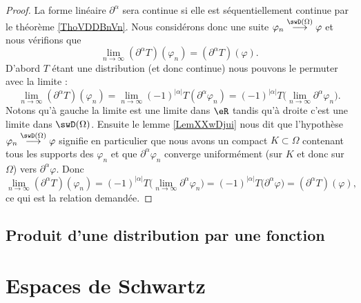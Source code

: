 \begin{proof}
    La forme linéaire \( \partial^{\alpha}\) sera continue si elle est séquentiellement continue par le théorème \ref{ThoVDDBnVn}. Nous considérons donc une suite \( \varphi_n\stackrel{\swD(\Omega)}{\longrightarrow}\varphi\) et nous vérifions que
    \begin{equation}
        \lim_{n\to \infty} (\partial^{\alpha}T)(\varphi_n)=(\partial^{\alpha}T)(\varphi).
    \end{equation}
    D'abord \( T\) étant une distribution (et donc continue) nous pouvons le permuter avec la limite :
    \begin{equation}
        \lim_{n\to \infty} (\partial^{\alpha}T)(\varphi_n)=\lim_{n\to \infty} (-1)^{| \alpha |}T(\partial^{\alpha}\varphi_n)=(-1)^{| \alpha |}T\big( \lim_{n\to \infty} \partial^{\alpha}\varphi_n \big).
    \end{equation}
    Notons qu'à gauche la limite est une limite dans \( \eR\) tandis qu'à droite c'est une limite dans \( \swD(\Omega)\). Ensuite le lemme \ref{LemXXwDjui} nous dit que l'hypothèse \( \varphi_n\stackrel{\swD(\Omega)}{\longrightarrow}\varphi\) signifie en particulier que nous avons un compact \( K\subset\Omega\) contenant tous les supports des \( \varphi_n\) et que \( \partial^{\alpha}\varphi_n\) converge uniformément (sur \( K\) et donc sur \( \Omega\)) vers \( \partial^{\alpha}\varphi\). Donc
    \begin{equation}
        \lim_{n\to \infty} (\partial^{\alpha}T)(\varphi_n)=(-1)^{| \alpha |}T\big( \lim_{n\to \infty} \partial^{\alpha}\varphi_n \big)=(-1)^{| \alpha |}T\big( \partial^{\alpha}\varphi \big)=(\partial^{\alpha}T)(\varphi),
    \end{equation}
    ce qui est la relation demandée.
\end{proof}

\subsection{Produit d'une distribution par une fonction}


\section{Espaces de Schwartz}

